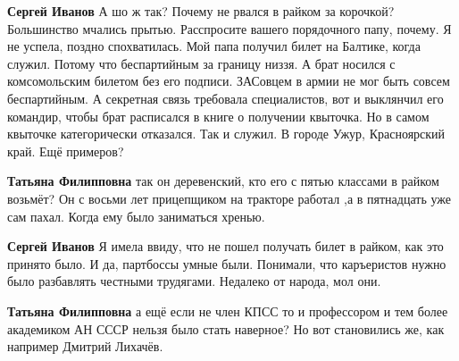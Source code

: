 \begin{itemize}
\begin{itemize}
 
\textbf{Сергей Иванов} А шо ж так? Почему не рвался в райком за корочкой?
Большинство мчались прытью. Расспросите вашего порядочного папу, почему. Я не
успела, поздно спохватилась. Мой папа получил билет на Балтике, когда служил.
Потому что беспартийным за границу низзя. А брат носился с комсомольским
билетом без его подписи. ЗАСовцем в армии не мог быть совсем беспартийным. А
секретная связь требовала специалистов, вот и выклянчил его командир, чтобы
брат расписался в книге о получении квыточка. Но в самом квыточке категорически
отказался. Так и служил. В городе Ужур, Красноярский край. Ещё примеров?

 
\textbf{Татьяна Филипповна} так он деревенский, кто его с пятью классами в
райком возьмёт? Он с восьми лет прицепщиком на тракторе работал ,а в пятнадцать
уже сам пахал. Когда ему было заниматься хренью.


 
\textbf{Сергей Иванов} Я имела ввиду, что не пошел получать билет в райком, как это принято было. И да, партбоссы умные были. Понимали, что каръеристов нужно было разбавлять честными трудягами. Недалеко от народа, мол они.

 
\textbf{Татьяна Филипповна} а ещё если не член КПСС то и профессором и тем более академиком АН СССР нельзя было стать наверное? Но вот становились же, как например Дмитрий Лихачёв.

 

\end{itemize}
\end{itemize}
